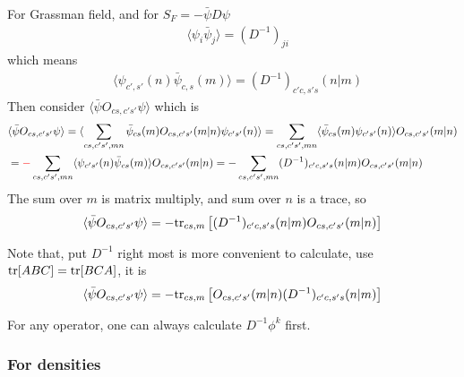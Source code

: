 For Grassman field, and for $S_F = -\bar{\psi } D \psi$
\begin{equation}
\begin{split}
&\langle  \psi _i \bar{\psi} _j\rangle= (D ^{-1})_{ji}
\end{split}
\end{equation}
which means
\begin{equation}
\begin{split}
&\langle  \psi _{c',s'}(n)\bar{\psi} _{c,s}(m) \rangle= (D ^{-1})_{c'c,s's}(n|m)
\end{split}
\end{equation}
Then consider $\langle \bar{\psi} O _{cs,c's'} \psi \rangle$ which is
\begin{equation}
\begin{split}
&\langle \bar{\psi} O_{cs,c's'} \psi \rangle = \langle \sum _{cs,c's',mn} \bar{\psi}_{cs}(m) O _{cs,c's'}(m|n) \psi _{c's'}(n)\rangle = \sum _{cs,c's',mn} \langle \bar{\psi} _{cs}(m)  \psi _{c's'}(n)\rangle O _{cs,c's'}(m|n)\\
&=\textcolor[rgb]{1,0,0}{-}\sum _{cs,c's',mn} \langle   \psi _{c's'}(n) \bar{\psi} _{cs}(m)\rangle O _{cs,c's'}(m|n)=-\sum _{cs,c's',mn} (D ^{-1})_{c'c,s's}(n|m) O _{cs,c's'}(m|n)\\
\end{split}
\end{equation}
The sum over $m$ is matrix multiply, and sum over $n$ is a trace, so
\begin{equation}
\begin{split}
&\langle \bar{\psi} O_{cs,c's'} \psi \rangle = -{\rm tr}_{cs,m}\left[ (D ^{-1})_{c'c,s's}(n|m) O _{cs,c's'}(m|n)\right]\\
\end{split}
\end{equation}

Note that, put $D^{-1}$ right most is more convenient to calculate, use ${\rm tr}[ABC]={\rm tr}[BCA]$, it is
\begin{equation}
\begin{split}
&\langle \bar{\psi} O_{cs,c's'} \psi \rangle = -{\rm tr}_{cs,m}\left[ O _{cs,c's'}(m|n) (D ^{-1})_{c'c,s's}(n|m)\right]\\
\end{split}
\end{equation}

For any operator, one can always calculate $D^{-1}\phi ^k$ first.

\subsubsection{\label{StochasticMethodsDensity}For densities}

